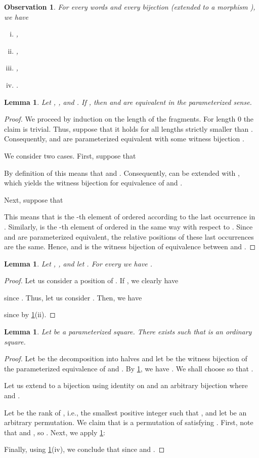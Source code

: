 \documentclass{article}
\theoremstyle{plain}
\newtheorem{lemma}[theorem]{Lemma}
\newtheorem{observation}[theorem]{Observation}
\theoremstyle{definition}
\theoremstyle{remark}
\begin{document}
\begin{observation}\label{obs:ord}
For every words  and every bijection  (extended to a morphism ), we
have
\begin{enumerate}[(i)]
  \item ,
  \item ,
  \item ,
  \item .
\end{enumerate}
\end{observation}

\begin{lemma}\label{lem:eq}
Let , , and .
If , then  and  are equivalent in the parameterized sense.
\end{lemma}
\begin{proof}
We proceed by induction on the length of the fragments. For length 0 the claim is trivial.
Thus, suppose that it holds for all lengths strictly smaller than . 
Consequently,  and  are parameterized equivalent with some witness bijection .

We consider two cases. First, suppose that

By definition of  this means that  and .
Consequently,  can be extended with , which yields the witness bijection for equivalence of 
and .

Next, suppose that

This means that  is the -th element of  ordered according to the last occurrence in .
Similarly,  is the -th element of  ordered in the same way with respect to .
Since  and  are parameterized equivalent, the relative positions of these last occurrences are the same.
Hence,  and  is the witness bijection of equivalence between  and .
\end{proof}

\begin{lemma}\label{lem:comp}
Let , , and let .
For every  we have .
\end{lemma}
\begin{proof}
Let us consider a position  of . If , we clearly have 

since . Thus, let us consider .
Then, we have

since  by \cref{obs:ord}(ii).
\end{proof}

\begin{lemma}\label{lem:pi}
Let  be a parameterized square. There exists  such that 
is an ordinary square. 
\end{lemma}
\begin{proof}
Let  be the decomposition into halves and let  be the witness bijection
of the parameterized equivalence of  and .
By \cref{lem:comp}, we have .
We shall choose  so that . 

Let us extend  to a bijection
 using identity on  and
an arbitrary bijection 
where  and .

Let  be the rank of , i.e., the smallest positive integer such that ,
and let  be an arbitrary permutation.
We claim that  is a permutation of  satisfying .
First, note that  and , so .
Next, we apply \cref{obs:ord}:

Finally, using \cref{obs:ord}(iv), we conclude that  since  and .
\end{proof}
 
\end{document}

